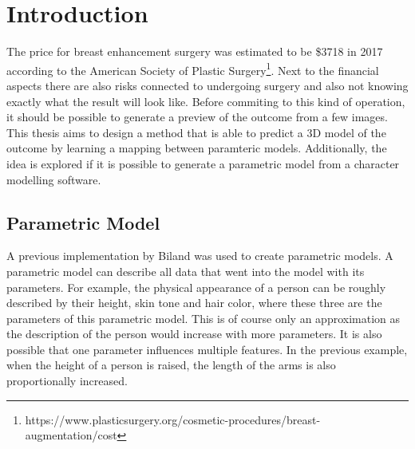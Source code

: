 \setcounter{chapter}{0}

\chapter{Introduction}

The price for breast enhancement surgery was estimated to be \$3718 in 2017 according to the American Society of Plastic Surgery\footnote{https://www.plasticsurgery.org/cosmetic-procedures/breast-augmentation/cost}. Next to the financial aspects there are also risks connected to undergoing surgery and also not knowing exactly what the result will look like. Before commiting to this kind of operation, it should be possible to generate a preview of the outcome from a few images. This thesis aims to design a method that is able to predict a 3D model of the outcome by learning a mapping between paramteric models. Additionally, the idea is explored if it is possible to generate a parametric model from a character modelling software.




\section{Parametric Model}
A previous implementation by Biland \cite{Biland17} was used to create parametric models. A parametric model can describe all data that went into the model with its parameters. For example, the physical appearance of a person can be roughly described by their height, skin tone and hair color, where these three are the parameters of this parametric model. This is of course only an approximation as the description of the person would increase with more parameters. It is also possible that one parameter influences multiple features. In the previous example, when the height of a person is raised, the length of the arms is also proportionally increased.

